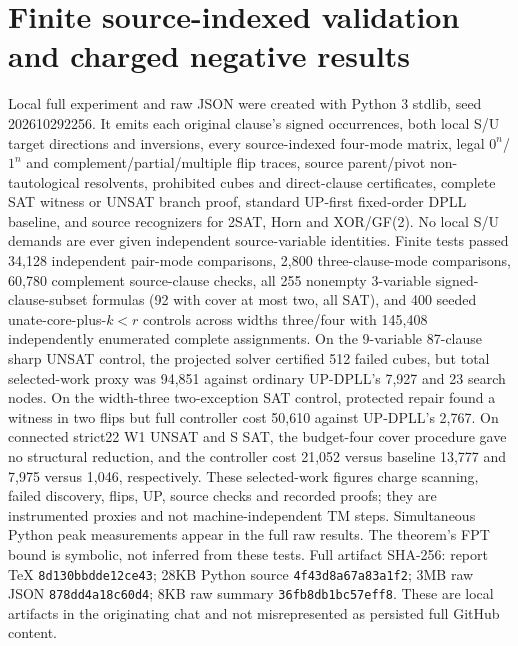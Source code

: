 \documentclass[10pt]{article}
\begin{document}
\section{Finite source-indexed validation and charged negative results}
Local full experiment and raw JSON were created with Python 3 stdlib, seed 202610292256. It emits each original clause's signed occurrences, both local S/U target directions and inversions, every source-indexed four-mode matrix, legal $0^n$/$1^n$ and complement/partial/multiple flip traces, source parent/pivot non-tautological resolvents, prohibited cubes and direct-clause certificates, complete SAT witness or UNSAT branch proof, standard UP-first fixed-order DPLL baseline, and source recognizers for 2SAT, Horn and XOR/GF(2). No local S/U demands are ever given independent source-variable identities.
Finite tests passed 34,128 independent pair-mode comparisons, 2,800 three-clause-mode comparisons, 60,780 complement source-clause checks, all 255 nonempty 3-variable signed-clause-subset formulas (92 with cover at most two, all SAT), and 400 seeded unate-core-plus-$k<r$ controls across widths three/four with 145,408 independently enumerated complete assignments. On the 9-variable 87-clause sharp UNSAT control, the projected solver certified 512 failed cubes, but total selected-work proxy was 94,851 against ordinary UP-DPLL's 7,927 and 23 search nodes. On the width-three two-exception SAT control, protected repair found a witness in two flips but full controller cost 50,610 against UP-DPLL's 2,767. On connected strict22 W1 UNSAT and S SAT, the budget-four cover procedure gave no structural reduction, and the controller cost 21,052 versus baseline 13,777 and 7,975 versus 1,046, respectively. These selected-work figures charge scanning, failed discovery, flips, UP, source checks and recorded proofs; they are instrumented proxies and not machine-independent TM steps. Simultaneous Python peak measurements appear in the full raw results. The theorem's FPT bound is symbolic, not inferred from these tests.
Full artifact SHA-256: report TeX \texttt{8d130bbdde12ce43}; 28KB Python source \texttt{4f43d8a67a83a1f2}; 3MB raw JSON \texttt{878dd4a18c60d4}; 8KB raw summary \texttt{36fb8db1bc57eff8}. These are local artifacts in the originating chat and not misrepresented as persisted full GitHub content.
\end{document}
